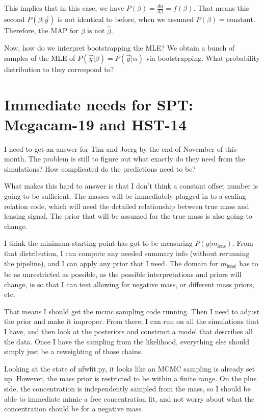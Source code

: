 \documentclass[11pt]{article}
\begin{document}
This implies that in this case, we have $P(\beta) = \frac{d\alpha}{d\beta} = f(\beta)$.
That means this second $P(\beta|\vec y)$ is not identical to before, when we assumed $P(\beta) = \mathrm{constant}$.
Therefore, the MAP for $\beta$ is not $\hat \beta$.

Now, how do we interpret bootstrapping the MLE?
We obtain a bunch of samples of the MLE of $P(\vec y|\beta) = P(\vec y|\alpha)$ via bootstrapping.
What probability distribution to they correspond to?





\section{Immediate needs for SPT: Megacam-19 and HST-14}
\label{sec:spt_immediateneeds}

I need to get an answer for Tim and Joerg by the end of November of this month. The problem is still to figure out what exactly do they need from the simulations? How complicated do the predictions need to be?

What makes this hard to answer is that I don't think a constant offset number is going to be sufficient. The masses will be immediately plugged in to a scaling relation code, which will need the detailed relationship between true mass and lensing signal. The prior that will be assumed for the true mass is also going to change.

I think the minimum starting point has got to be measuring $P(g | m_{\mathrm{lens}})$. From that distribution, I can compute any needed summary info (without rerunning the pipeline), and I can apply any prior that I need. The domain for $m_{\mathrm{lens}|}$ has to be as unrestricted as possible, as the possible interpretations and priors will change, ie so that I can test allowing for negative mass, or different mass priors, etc.

That means I should get the mcmc sampling code running. Then I need to adjust the prior and make it improper. From there, I can run on all the simulations that I have, and then look at the posteriors and construct a model that describes all the data. Once I have the sampling from the likelihood, everything else should simply just be a reweighting of those chains.


Looking at the state of nfwfit.py, it looks like an MCMC sampling is already set up. However, the mass prior is restricted to be within a finite range. On the plus side, the concentration is independently sampled from the mass, so I should be able to immediate mimic a free concentration fit, and not worry about what the concentration should be for a negative mass.
\end{document}
